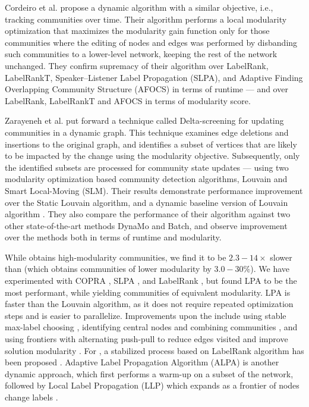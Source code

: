 Cordeiro et al. \cite{com-cordeiro16} propose a dynamic algorithm with a similar objective, i.e., tracking communities over time. Their algorithm performs a local modularity optimization that maximizes the modularity gain function only for those communities where the editing of nodes and edges was performed by disbanding such communities to a lower-level network, keeping the rest of the network unchanged. They confirm supremacy of their algorithm over LabelRank, LabelRankT, Speaker–Listener Label Propagation (SLPA), and Adaptive Finding Overlapping Community Structure (AFOCS) in terms of runtime --- and over LabelRank, LabelRankT and AFOCS in terms of modularity score.

Zarayeneh et al. \cite{com-zarayeneh21} put forward a technique called Delta-screening for updating communities in a dynamic graph. This technique examines edge deletions and insertions to the original graph, and identifies a subset of vertices that are likely to be impacted by the change using the modularity objective. Subsequently, only the identified subsets are processed for community state updates --- using two modularity optimization based community detection algorithms, Louvain and Smart Local-Moving (SLM). Their results demonstrate performance improvement over the Static Louvain algorithm, and a dynamic baseline version of Louvain algorithm \cite{com-aynaud10}. They also compare the performance of their algorithm against two other state-of-the-art methods DynaMo and Batch, and observe improvement over the methods both in terms of runtime and modularity.

While \Lou{} obtains high-modularity communities, we find it to be $2.3 - 14\times$ slower than \LPA{} (which obtains communities of lower modularity by $3.0 - 30\%$). We have experimented with COPRA \cite{com-gregory10}, SLPA \cite{com-xie11}, and LabelRank \cite{com-xie13}, but found LPA \cite{com-raghavan07} to be the most performant, while yielding communities of equivalent modularity. LPA is faster than the Louvain algorithm, as it does not require repeated optimization steps and is easier to parallelize. Improvements upon the \LPA{} include using stable max-label choosing \cite{com-xing14}, identifying central nodes and combining communities \cite{com-you20}, and using frontiers with alternating push-pull to reduce edges visited and improve solution modularity \cite{com-liu20}. For \LPA{}, a stabilized process based on LabelRank algorithm has been proposed \cite{com-xie13}. Adaptive Label Propagation Algorithm (ALPA) is another dynamic approach, which first performs a warm-up \LPA{} on a subset of the network, followed by Local Label Propagation (LLP) which expands as a frontier of nodes change labels \cite{com-han17}.




